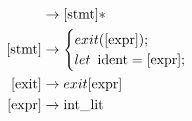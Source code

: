 \documentclass[11pt]{article}
\begin{document}
\begin{align}
  [\text{prog}] &\to [\text{stmt}]* \\
  [\text{stmt}] &\to
  \begin{cases}
    exit([\text{expr}]); \\
    let \enspace \text{ident} = [\text{expr}];
  \end{cases} \\
  [\text{exit}] &\to exit\space[\text{expr}] \\
  [\text{expr}] &\to \text{int\_lit} \\
\end{align}
\end{document}
